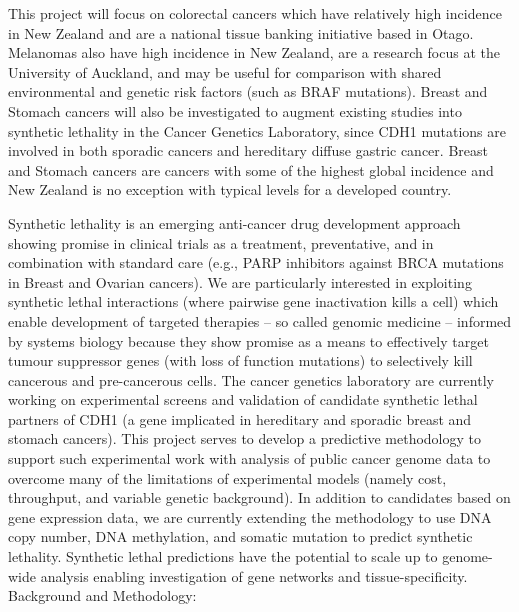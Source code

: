 This project will focus on colorectal cancers which have relatively high incidence in New Zealand and are a national tissue banking initiative based in Otago. Melanomas also have high incidence in New Zealand, are a research focus at the University of Auckland, and may be useful for comparison with shared environmental and genetic risk factors (such as BRAF mutations). Breast and Stomach cancers will also be investigated to augment existing studies into synthetic lethality in the Cancer Genetics Laboratory, since CDH1 mutations are involved in both sporadic cancers and hereditary diffuse gastric cancer. Breast and Stomach cancers are cancers with some of the highest global incidence and New Zealand is no exception with typical levels for a developed country.



Synthetic lethality is an emerging anti-cancer drug development approach showing promise in clinical trials as a treatment, preventative, and in combination with standard care (e.g., PARP inhibitors against BRCA mutations in Breast and Ovarian cancers). We are particularly interested in exploiting synthetic lethal interactions (where pairwise gene inactivation kills a cell) which enable development of targeted therapies – so called genomic medicine – informed by systems biology because they show promise as a means to effectively target tumour suppressor genes (with loss of function mutations) to selectively kill cancerous and pre-cancerous cells. The cancer genetics laboratory are currently working on experimental screens and validation of candidate synthetic lethal partners of CDH1 (a gene implicated in hereditary and sporadic breast and stomach cancers). This project serves to develop a predictive methodology to support such experimental work with analysis of public cancer genome data to overcome many of the limitations of experimental models (namely cost, throughput, and variable genetic background). In addition to candidates based on gene expression data, we are currently extending the methodology to use DNA copy number, DNA methylation, and somatic mutation to predict synthetic lethality. Synthetic lethal predictions have the potential to scale up to genome-wide analysis enabling investigation of gene networks and tissue-specificity.
Background and Methodology:

